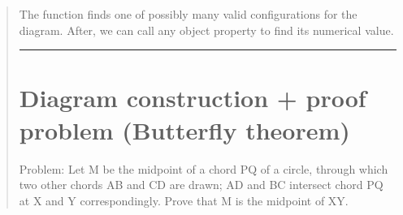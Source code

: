 \documentclass[letterpaper,10pt,english]{sphinxmanual}
\begin{document}
\begin{quote}
\begin{sphinxVerbatim}[commandchars=\\\{\}]
   
   
  

\end{sphinxVerbatim}

\sphinxAtStartPar
{}

\sphinxAtStartPar
The function  finds one of possibly many valid configurations for the diagram. After, we can call any object property to find its numerical value.

\begin{sphinxVerbatim}[commandchars=\\\{\}]
\end{sphinxVerbatim}


\bigskip\hrule\bigskip



\section{Diagram construction + proof problem (Butterfly theorem)}
\label{\detokenize{examples:diagram-construction-proof-problem-butterfly-theorem}}
\sphinxAtStartPar
Problem: Let M be the midpoint of a chord PQ of a circle, through which two other chords AB and CD are drawn; AD and BC intersect chord PQ at X and Y correspondingly. Prove that M is the midpoint of XY.

\begin{sphinxVerbatim}[commandchars=\\\{\}]
    



\end{sphinxVerbatim}
\end{quote}
\end{document}
